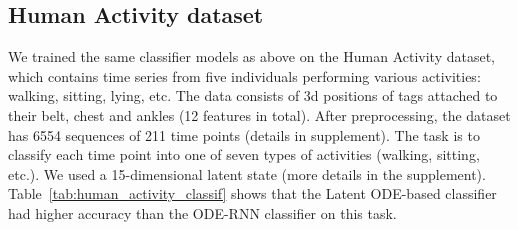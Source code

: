 \documentclass{article}
\begin{document}
\subsection{Human Activity dataset}


We trained the same classifier models as above on the Human Activity dataset, which contains time series from five individuals performing various activities: walking, sitting, lying, etc.
The data consists of 3d positions of tags attached to their belt, chest and ankles (12 features in total).
After preprocessing, the dataset has 6554 sequences of 211 time points (details in supplement).
The task is to classify each time point into one of seven types of activities (walking, sitting, etc.).
We used a 15-dimensional latent state (more details in the supplement).
Table~\ref{tab:human_activity_classif} shows that the Latent ODE-based classifier had higher accuracy than the ODE-RNN classifier on this task.
\end{document}
